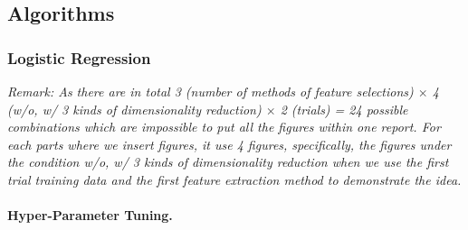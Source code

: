\documentclass{article}
\begin{document}
\subsection{Algorithms}
\subsubsection{Logistic Regression}

\emph{Remark: As there are in total 3 (number of methods of feature selections) $\times$ 4 (w/o, w/ 3 kinds of dimensionality reduction) $\times$ 2 (trials) = 24 possible combinations which are impossible to put all the figures within one report. For each parts where we insert figures, it use 4 figures, specifically, the figures under the condition w/o, w/ 3 kinds of dimensionality reduction when we use the first trial training data and the first feature extraction method to demonstrate the idea.}

\paragraph{Hyper-Parameter Tuning.}
\end{document}
